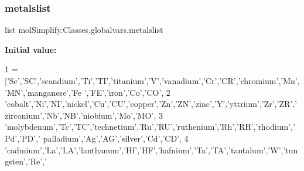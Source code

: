 \subsubsection{\texorpdfstring{metalslist}{metalslist}}
{\footnotesize\ttfamily list mol\+Simplify.\+Classes.\+globalvars.\+metalslist}

{\bfseries Initial value\+:}
\begin{DoxyCode}
1 =  [\textcolor{stringliteral}{'Sc'},\textcolor{stringliteral}{'SC'},\textcolor{stringliteral}{'scandium'},\textcolor{stringliteral}{'Ti'},\textcolor{stringliteral}{'TI'},\textcolor{stringliteral}{'titanium'},\textcolor{stringliteral}{'V'},\textcolor{stringliteral}{'vanadium'},\textcolor{stringliteral}{'Cr'},\textcolor{stringliteral}{'CR'},\textcolor{stringliteral}{'chromium'},\textcolor{stringliteral}{'Mn'},\textcolor{stringliteral}{'MN'},\textcolor{stringliteral}{'manganese'},\textcolor{stringliteral}{'Fe
      '},\textcolor{stringliteral}{'FE'},\textcolor{stringliteral}{'iron'},\textcolor{stringliteral}{'Co'},\textcolor{stringliteral}{'CO'},
2             \textcolor{stringliteral}{'cobalt'},\textcolor{stringliteral}{'Ni'},\textcolor{stringliteral}{'NI'},\textcolor{stringliteral}{'nickel'},\textcolor{stringliteral}{'Cu'},\textcolor{stringliteral}{'CU'},\textcolor{stringliteral}{'copper'},\textcolor{stringliteral}{'Zn'},\textcolor{stringliteral}{'ZN'},\textcolor{stringliteral}{'zinc'},\textcolor{stringliteral}{'Y'},\textcolor{stringliteral}{'yttrium'},\textcolor{stringliteral}{'Zr'},\textcolor{stringliteral}{'ZR'},\textcolor{stringliteral}{'
      zirconium'},\textcolor{stringliteral}{'Nb'},\textcolor{stringliteral}{'NB'},\textcolor{stringliteral}{'niobium'},\textcolor{stringliteral}{'Mo'},\textcolor{stringliteral}{'MO'},
3             \textcolor{stringliteral}{'molybdenum'},\textcolor{stringliteral}{'Tc'},\textcolor{stringliteral}{'TC'},\textcolor{stringliteral}{'technetium'},\textcolor{stringliteral}{'Ru'},\textcolor{stringliteral}{'RU'},\textcolor{stringliteral}{'ruthenium'},\textcolor{stringliteral}{'Rh'},\textcolor{stringliteral}{'RH'},\textcolor{stringliteral}{'rhodium'},\textcolor{stringliteral}{'Pd'},\textcolor{stringliteral}{'PD'},\textcolor{stringliteral}{'
      palladium'},\textcolor{stringliteral}{'Ag'},\textcolor{stringliteral}{'AG'},\textcolor{stringliteral}{'silver'},\textcolor{stringliteral}{'Cd'},\textcolor{stringliteral}{'CD'},
4             \textcolor{stringliteral}{'cadmium'},\textcolor{stringliteral}{'La'},\textcolor{stringliteral}{'LA'},\textcolor{stringliteral}{'lanthanum'},\textcolor{stringliteral}{'Hf'},\textcolor{stringliteral}{'HF'},\textcolor{stringliteral}{'hafnium'},\textcolor{stringliteral}{'Ta'},\textcolor{stringliteral}{'TA'},\textcolor{stringliteral}{'tantalum'},\textcolor{stringliteral}{'W'},\textcolor{stringliteral}{'tungsten'},\textcolor{stringliteral}{'Re'},\textcolor{stringliteral}{'
}
\end{DoxyCode}
